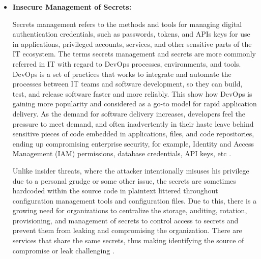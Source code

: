 \begin{itemize}
    \item \textbf{Insecure Management of Secrets:} \par Secrets management refers to the methods and tools for managing digital authentication credentials, such as passwords, tokens, and APIs keys for use in applications, privileged accounts, services, and other sensitive parts of the IT ecosystem.
    The terms secrets management and secrets are more commonly referred in IT with regard to DevOps processes, environments, and tools.
    DevOps is a set of practices that works to integrate and automate the processes between IT teams and software development, so they can build, test, and release software faster and more reliably.
    This show how DevOps is gaining more popularity and considered as a go-to model for rapid application delivery.
    As the demand for software delivery increases, developers feel the pressure to meet demand, and often inadvertently in their haste leave behind sensitive pieces of code embedded in applications, files, and code repositories, ending up compromising enterprise security, for example, Identity and Access Management (IAM) permissions, database credentials, API keys, etc \cite{61}.

    Unlike insider threats, where the attacker intentionally misuses his privilege due to a personal grudge or some
    other issue, the secrets are sometimes hardcoded within the source code in plaintext littered throughout configuration management tools and configuration files.
    Due to this, there is a growing need for organizations to centralize the storage, auditing, rotation, provisioning, and management of secrets to control access to secrets and prevent them from leaking and compromising the organization. There are services that share the same secrets, thus making identifying the source of compromise or leak challenging \cite{62}.
\end{itemize}

